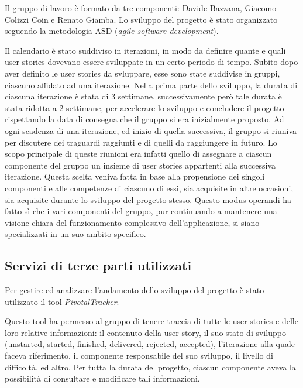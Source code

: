 Il gruppo di lavoro è formato da tre componenti: Davide Bazzana,
Giacomo Colizzi Coin e Renato Giamba.
\newline
\newline
Lo sviluppo del progetto è stato organizzato seguendo la metodologia
ASD (\textit{agile software development}).

Il calendario è stato suddiviso in iterazioni, in modo da definire
quante e quali user stories dovevano essere sviluppate in un certo
periodo di tempo. Subito dopo aver definito le user stories da
svluppare, esse sono state suddivise in gruppi, ciascuno affidato ad
una iterazione. Nella prima parte dello sviluppo, la durata di
ciascuna iterazione è stata di 3 settimane, successivamente però tale
durata è stata ridotta a 2 settimane, per accelerare lo sviluppo e
concludere il progetto rispettando la data di consegna che il gruppo
si era inizialmente proposto.  Ad ogni scadenza di una iterazione, ed
inizio di quella successiva, il gruppo si riuniva per discutere dei
traguardi raggiunti e di quelli da raggiungere in futuro. Lo scopo
principale di queste riunioni era infatti quello di assegnare a
ciascun componente del gruppo un insieme di user stories appartenti
alla successiva iterazione.  Questa scelta veniva fatta in base alla
propensione dei singoli componenti e alle competenze di ciascuno di
essi, sia acquisite in altre occasioni, sia acquisite durante lo
sviluppo del progetto stesso. Questo modus operandi ha fatto sì che i
vari componenti del gruppo, pur continuando a mantenere una visione
chiara del funzionamento complessivo dell'applicazione, si siano
specializzati in un suo ambito specifico.

\subsection{Servizi di terze parti utilizzati}

Per gestire ed analizzare l'andamento dello sviluppo del progetto è
stato utilizzato il tool \textit{PivotalTracker}.

Questo tool ha permesso al gruppo di tenere traccia di tutte le user
stories e delle loro relative informazioni: il contenuto della user
story, il suo stato di sviluppo (unstarted, started, finished, delivered,
rejected, accepted), l'iterazione alla quale faceva riferimento, il
componente responsabile del suo sviluppo, il livello di difficoltà, ed
altro. Per tutta la durata del progetto, ciascun componente aveva la
possibilità di consultare e modificare tali informazioni.

